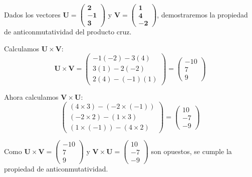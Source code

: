 \begin{example}
Dados los vectores $\mathbf{U} = \begin{pmatrix} \boldsymbol{2} \\ \boldsymbol{-1} \\ \boldsymbol{3} \end{pmatrix}$ y $\mathbf{V} = \begin{pmatrix} \boldsymbol{1} \\ \boldsymbol{4} \\ \boldsymbol{-2} \end{pmatrix}$, demostraremos la propiedad de anticonmutatividad del producto cruz.

Calculamos $\mathbf{U} \times \mathbf{V}$:
\[
\mathbf{U} \times \mathbf{V} = \begin{pmatrix} -1( -2 ) - 3( 4 ) \\ 3( 1 ) - 2( -2 ) \\ 2( 4 ) - (-1)( 1 ) \end{pmatrix} = \begin{pmatrix} -10 \\ 7 \\ 9 \end{pmatrix}
\]

Ahora calculamos $\mathbf{V} \times \mathbf{U}$:
\[ \begin{pmatrix}
(4 \times 3) - (-2 \times (-1)) \\
(-2 \times 2) - (1 \times 3) \\
(1 \times (-1)) - (4 \times 2)
\end{pmatrix} = \begin{pmatrix} 10 \\ -7 \\ -9 \end{pmatrix}
\]

Como $\mathbf{U} \times \mathbf{V} = \begin{pmatrix} -10 \\ 7 \\ 9 \end{pmatrix}$ y $\mathbf{V} \times \mathbf{U} = \begin{pmatrix} 10 \\ -7 \\ -9 \end{pmatrix}$ son opuestos, se cumple la propiedad de anticonmutatividad.

\end{example}
